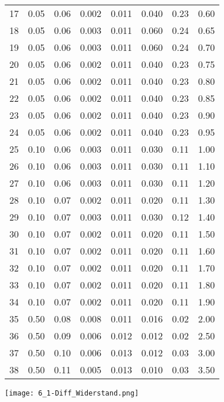 \begin{center}
\begin{tabular}{l|cccc|ccc}
        17 &     0.05 &         0.06 &     0.002 &         0.011 &  0.040 &      0.23 &  0.60 \\      
        18 &     0.05 &         0.06 &     0.003 &         0.011 &  0.060 &      0.24 &  0.65 \\      
        19 &     0.05 &         0.06 &     0.003 &         0.011 &  0.060 &      0.24 &  0.70 \\      
        20 &     0.05 &         0.06 &     0.002 &         0.011 &  0.040 &      0.23 &  0.75 \\      
        21 &     0.05 &         0.06 &     0.002 &         0.011 &  0.040 &      0.23 &  0.80 \\      
        22 &     0.05 &         0.06 &     0.002 &         0.011 &  0.040 &      0.23 &  0.85 \\      
        23 &     0.05 &         0.06 &     0.002 &         0.011 &  0.040 &      0.23 &  0.90 \\      
        24 &     0.05 &         0.06 &     0.002 &         0.011 &  0.040 &      0.23 &  0.95 \\      
        25 &     0.10 &         0.06 &     0.003 &         0.011 &  0.030 &      0.11 &  1.00 \\      
        26 &     0.10 &         0.06 &     0.003 &         0.011 &  0.030 &      0.11 &  1.10 \\      
        27 &     0.10 &         0.06 &     0.003 &         0.011 &  0.030 &      0.11 &  1.20 \\      
        28 &     0.10 &         0.07 &     0.002 &         0.011 &  0.020 &      0.11 &  1.30 \\      
        29 &     0.10 &         0.07 &     0.003 &         0.011 &  0.030 &      0.12 &  1.40 \\      
        30 &     0.10 &         0.07 &     0.002 &         0.011 &  0.020 &      0.11 &  1.50 \\      
        31 &     0.10 &         0.07 &     0.002 &         0.011 &  0.020 &      0.11 &  1.60 \\      
        32 &     0.10 &         0.07 &     0.002 &         0.011 &  0.020 &      0.11 &  1.70 \\      
        33 &     0.10 &         0.07 &     0.002 &         0.011 &  0.020 &      0.11 &  1.80 \\      
        34 &     0.10 &         0.07 &     0.002 &         0.011 &  0.020 &      0.11 &  1.90 \\      
        35 &     0.50 &         0.08 &     0.008 &         0.011 &  0.016 &      0.02 &  2.00 \\      
        36 &     0.50 &         0.09 &     0.006 &         0.012 &  0.012 &      0.02 &  2.50 \\      
        37 &     0.50 &         0.10 &     0.006 &         0.013 &  0.012 &      0.03 &  3.00 \\      
        38 &     0.50 &         0.11 &     0.005 &         0.013 &  0.010 &      0.03 &  3.50 \\
    \end{tabular}
\end{center}
\newpage
\begin{center}
    \texttt{[image: 6\_1-Diff\_Widerstand.png]}
\end{center}
\newpage
